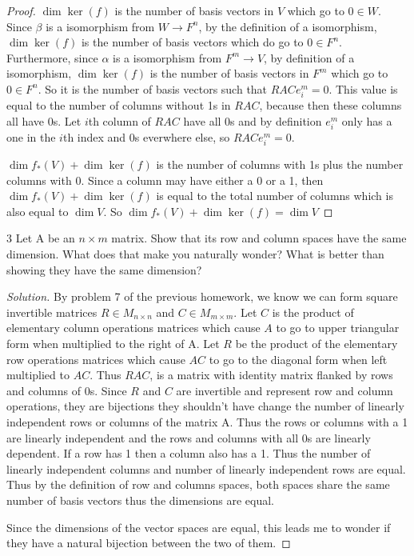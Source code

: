 \documentclass{article}
\newcommand{\rarr}[0]{\rightarrow}
\newenvironment{solution}
{\renewcommand\qedsymbol{$\blacksquare$}\begin{proof}[Solution]}
		{\end{proof}}
\begin{document}
\begin{proof}
	$\dim \ker(f)$ is the number of basis vectors in $V$ which go to $0 \in W$. Since $\beta$ is a isomorphism from $W \rarr F^n$, by the definition of a isomorphism, $\dim \ker(f)$ is the number of basis vectors which do go to $0 \in F^n$. Furthermore, since $\alpha$ is a isomorphism from $F^m \rarr V$, by definition of a isomorphism, $\dim \ker(f)$ is the number of basis vectors in $F^m$ which go to $0 \in F^n$. So it is the number of basis vectors such that $RACe^m_i = 0$. This value is equal to the number of columns without 1s in $RAC$, because then these columns all have 0s. Let  $i$th column of $RAC$ have all 0s and by definition $e_{i}^m$ only has a one in the $i$th index and 0s everwhere else, so $RACe_{i}^m = 0$.

	$\dim f_*(V) + \dim \ker(f)$ is the number of columns with 1s plus the number columns with 0. Since a column may have either a 0 or a 1, then $\dim f_*(V) + \dim \ker(f)$ is equal to the total number of columns which is also equal to $\dim V$. So $\dim f_*(V) + \dim \ker(f) = \dim V$
	
\end{proof}
\bigskip

\begin{PROB}{3}\label{Problem 3.}
	Let A be an $n \times m$ matrix. Show that its row and column spaces have the same dimension. What does that make you naturally wonder? What is better than showing they have the same dimension?
\end{PROB}
\begin{solution}
	By problem 7 of the previous homework, we know we can form square invertible matrices $R \in M_{n \times n}$ and $C \in M_{m \times m}$. Let $C$ is the product of elementary column operations matrices which cause $A$ to go to upper triangular form when multiplied to the right of A. Let $R$ be the product of the elementary row operations matrices which cause $AC$ to go to the diagonal form when left multiplied to $AC$. Thus $RAC$, is a matrix with identity matrix flanked by rows and columns of 0s. Since $R$ and $C$ are invertible and represent row and column operations, they are bijections they shouldn't have change the number of linearly independent rows or columns of the matrix A. Thus the rows or columns with a 1 are linearly independent and the rows and columns with all 0s are linearly dependent. If a row has 1 then a column also has a 1. Thus the number of linearly independent columns and number of linearly independent rows are equal. Thus by the definition of row and columns spaces, both spaces share the same number of basis vectors thus the dimensions are equal.

	Since the dimensions of the vector spaces are equal, this leads me to wonder if they have a natural bijection between the two of them. 
\end{solution}
\end{document}
